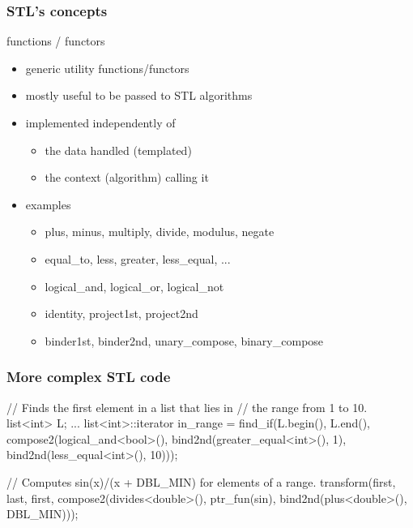 \begin{frame}[fragile]
  \frametitle{STL's concepts}
  \begin{block}{functions / functors}
    \begin{itemize}
      \item generic utility functions/functors
      \item mostly useful to be passed to STL algorithms
    \item implemented independently of
      \begin{itemize}
      \item the data handled (templated)
      \item the context (algorithm) calling it
      \end{itemize}
    \item examples
      \begin{itemize}
      \item plus, minus, multiply, divide, modulus, negate
      \item equal\_to, less, greater, less\_equal, ...
      \item logical\_and, logical\_or, logical\_not
      \item identity, project1st, project2nd
      \item binder1st, binder2nd, unary\_compose, binary\_compose
      \end{itemize}
    \end{itemize}
  \end{block}
\end{frame}


\begin{frame}[fragile,label=STLcode]
  \frametitle{More complex STL code}
  \begin{cppcode*}{}
    // Finds the first element in a list that lies in
    // the range from 1 to 10.
    list<int> L;
    ...
    list<int>::iterator in_range = 
      find_if(L.begin(), L.end(),
              compose2(logical_and<bool>(),
                       bind2nd(greater_equal<int>(), 1),
                       bind2nd(less_equal<int>(), 10)));

    // Computes sin(x)/(x + DBL_MIN) for elements of a range.
    transform(first, last, first,
              compose2(divides<double>(),
                       ptr_fun(sin),
                       bind2nd(plus<double>(), DBL_MIN)));
  \end{cppcode*}
\end{frame}

